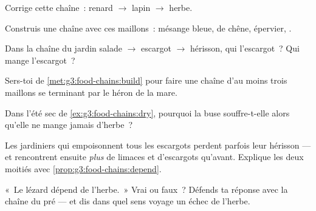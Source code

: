 \begin{exercise}[$\star$]\label{exo:g3:food-chains:4}
Corrige cette chaîne~: renard $\rightarrow$ lapin $\rightarrow$
herbe.
\end{exercise}

\begin{exercise}[$\star$]\label{exo:g3:food-chains:5}
Construis une chaîne avec ces maillons~: mésange bleue,  de
chêne, épervier, .
\end{exercise}

\begin{exercise}[$\star$]\label{exo:g3:food-chains:6}
Dans la chaîne du jardin salade $\rightarrow$ escargot
$\rightarrow$ hérisson, qui  l'escargot~? Qui mange
l'escargot~?
\end{exercise}

\begin{exercise}[$\star$]\label{exo:g3:food-chains:7}
Sers-toi de \cref{met:g3:food-chains:build} pour faire une chaîne
d'au moins trois maillons se terminant par le héron de la mare.
\end{exercise}

\begin{exercise}[$\star$]\label{exo:g3:food-chains:8}
Dans l'été sec de \cref{ex:g3:food-chains:dry}, pourquoi la buse
souffre-t-elle alors qu'elle ne mange jamais d'herbe~?
\end{exercise}

\begin{exercise}[$\star\star$]\label{exo:g3:food-chains:9}
Les jardiniers qui empoisonnent tous les escargots perdent parfois
leur hérisson --- et rencontrent ensuite \emph{plus} de limaces et
d'escargots qu'avant. Explique les deux moitiés avec
\cref{prop:g3:food-chains:depend}.
\end{exercise}

\begin{exercise}[$\star\star$]\label{exo:g3:food-chains:10}
«~Le lézard dépend de l'herbe.~» Vrai ou faux~? Défends ta réponse
avec la chaîne du pré --- et dis dans quel sens voyage un échec de
l'herbe.
\end{exercise}
